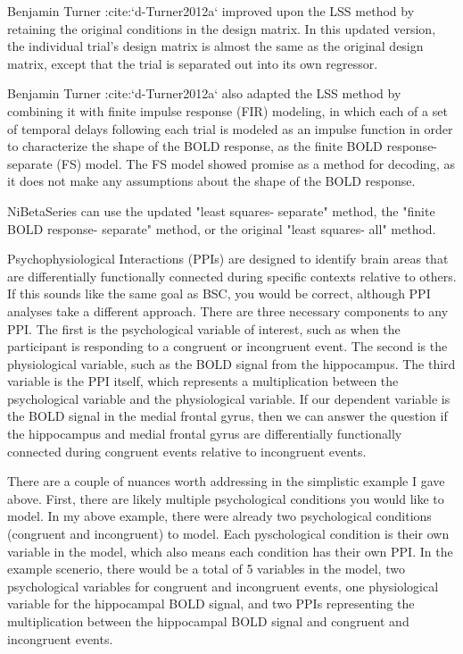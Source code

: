 \documentclass[phd,appendix,figures]{uithesis}
\begin{document}
Benjamin Turner :cite:`d-Turner2012a` improved upon the LSS method by retaining
the original conditions in the design matrix.
In this updated version, the individual trial's design matrix is almost the same
as the original design matrix, except that the trial is separated out into its
own regressor.

Benjamin Turner :cite:`d-Turner2012a` also adapted the LSS method by combining
it with finite impulse response (FIR) modeling, in which each of a set of
temporal delays following each trial is modeled as an impulse function in order
to characterize the shape of the BOLD response, as the
finite BOLD response- separate (FS) model.
The FS model showed promise as a method for decoding, as it does not make any
assumptions about the shape of the BOLD response.

NiBetaSeries can use the updated "least squares- separate" method,
the "finite BOLD response- separate" method, or the original
"least squares- all" method.

Psychophysiological Interactions (PPIs) are designed to 
identify brain areas that are differentially functionally connected
during specific contexts relative to others.
If this sounds like the same goal as BSC, you would be correct, although PPI
analyses take a different approach.
There are three necessary components to any PPI.
The first is the psychological variable of interest, such as when the participant
is responding to a congruent or incongruent event.
The second is the physiological variable, such as the BOLD signal from
the hippocampus.
The third variable is the PPI itself, which represents a multiplication
between the psychological variable and the physiological variable.
If our dependent variable is the BOLD signal in the medial frontal gyrus,
then we can answer the question if the hippocampus and medial frontal gyrus
are differentially functionally connected during congruent events relative
to incongruent events.

There are a couple of nuances worth addressing in the simplistic example I gave above.
First, there are likely multiple psychological conditions you would like to model.
In my above example, there were already two psychological conditions (congruent and incongruent)
to model.
Each pyschological condition is their own variable in the model, which also
means each condition has their own PPI.
In the example scenerio, there would be a total of 5 variables in the model,
two psychological variables for congruent and incongruent events,
one physiological variable for the hippocampal BOLD signal,
and two PPIs representing the multiplication between the hippocampal BOLD signal
and congruent and incongruent events.
\end{document}

